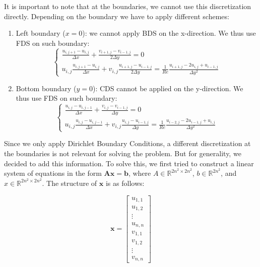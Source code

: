 \documentclass{article}
\begin{document}
It is important to note that at the boundaries, we cannot use this discretization directly. Depending on the boundary we have to apply different schemes:
\begin{enumerate}
  \item Left boundary (\( x = 0 \)): we cannot apply BDS on the x-direction. We thus use FDS on such boundary:
  \[
\begin{cases}
  \frac{u_{i,j+1} - u_{i,j}}{\Delta x} + \frac{v_{i+1,j} - v_{i-1,j}}{2 \Delta y} = 0 \\
  u_{i,j}\frac{u_{i,j+1} - u_{i,j}}{\Delta x}  + v_{i,j} \frac{u_{i+1,j} - u_{i-1,j}}{2 \Delta y} = \frac{1}{Re} \frac{u_{i+1,j} - 2u_{i,j} + u_{i-1,j}}{\Delta y^2}
\end{cases}
\]
\item Bottom boundary (\( y = 0 \)): CDS cannot be applied on the y-direction. We thus use FDS on such boundary:
\[
  \begin{cases}
    \frac{u_{i,j} - u_{i,j-1}}{\Delta x} + \frac{v_{i,j} - v_{i-1,j}}{\Delta y} = 0 \\
    u_{i,j}\frac{u_{i,j} - u_{i,j-1}}{\Delta x}  + v_{i,j} \frac{u_{i,j} - u_{i-1,j}}{\Delta y} = \frac{1}{Re} \frac{u_{i-2,j} - 2u_{i-1,j} + u_{i,j}}{\Delta y^2}
  \end{cases}
\]
\end{enumerate}
Since we only apply Dirichlet Boundary Conditions, a different discretization at the boundaries is not relevant for solving the problem. But for generality, we decided to add this information.
To solve this, we first tried to construct a linear system of equations in the form \( \mathbf{A} \mathbf{x} = \mathbf{b} \), where \( A \in \mathbb{R}^{2n^2 \times 2n^2} \), \( b \in \mathbb{R}^{2n^2} \), and \( x \in \mathbb{R}^{2n^2 \times 2n^2} \). The structure of \( \mathbf{x} \) is as follows:

\[
\mathbf{x} = \begin{bmatrix}
u_{1,1} \\
u_{1,2} \\
\vdots \\
u_{n,n} \\
v_{1,1} \\
v_{1,2} \\
\vdots \\
v_{n,n}
\end{bmatrix}
\]
\end{document}
